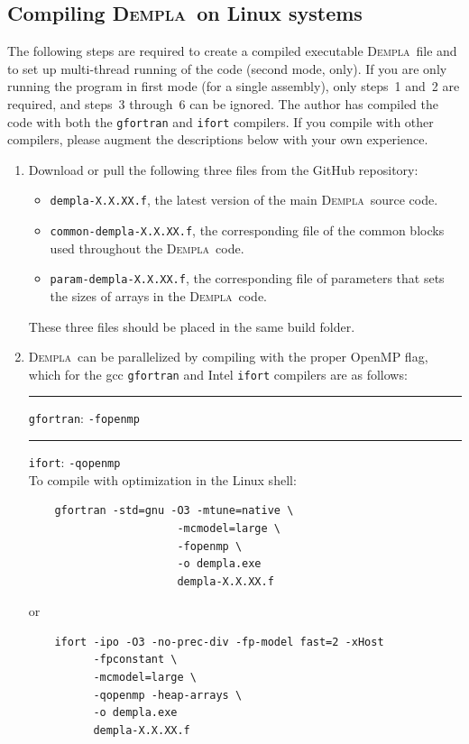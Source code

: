 \documentclass[letterpaper,11pt]{article}
\newcommand{\Dempla}{\textsc{Dempla}}
\begin{document}
\subsection{Compiling \Dempla\ on Linux systems}\label{sec:UnixSystems}
%
The following steps are required
to create a compiled executable \Dempla\ file and to set up
multi-thread running of the code (second mode, only).
If you are only running the program in first mode
(for a single assembly), only steps~1 and~2 are required,
and steps~3 through~6 can be ignored.
The author has compiled the code with both the \texttt{gfortran}
and \texttt{ifort} compilers.
If you compile with other compilers, please augment the descriptions
below with your own experience.
%
\begin{enumerate}
\item
Download or pull the following three files from the GitHub
repository:
  \begin{itemize}
  	\item
  	  \texttt{dempla-X.X.XX.f}, the latest version of the 
  	  main \Dempla\ source code.
  	\item
  	  \texttt{common-dempla-X.X.XX.f}, the corresponding file of
  	  the common blocks used throughout the \Dempla\ code.
  	\item
  	  \texttt{param-dempla-X.X.XX.f}, the corresponding file of
  	  parameters that sets the sizes of arrays in the \Dempla\ code.
  \end{itemize}
These three files should be placed in the same build folder.
%
\item
\Dempla\ can be parallelized by compiling with the proper OpenMP flag,
which for the gcc \texttt{gfortran} and Intel \texttt{ifort} compilers
are as follows:\\
\rule{3ex}{0ex} \texttt{gfortran}: \texttt{-fopenmp}\\
\rule{3ex}{0ex} \texttt{ifort}:    \texttt{-qopenmp}\\
To compile with optimization in the Linux shell:
\begin{verbatim}
    gfortran -std=gnu -O3 -mtune=native \
                       -mcmodel=large \
                       -fopenmp \
                       -o dempla.exe
                       dempla-X.X.XX.f
\end{verbatim}
or
\begin{verbatim}
    ifort -ipo -O3 -no-prec-div -fp-model fast=2 -xHost
          -fpconstant \
          -mcmodel=large \
          -qopenmp -heap-arrays \
          -o dempla.exe
          dempla-X.X.XX.f

\end{verbatim}
\end{enumerate}
\end{document}
